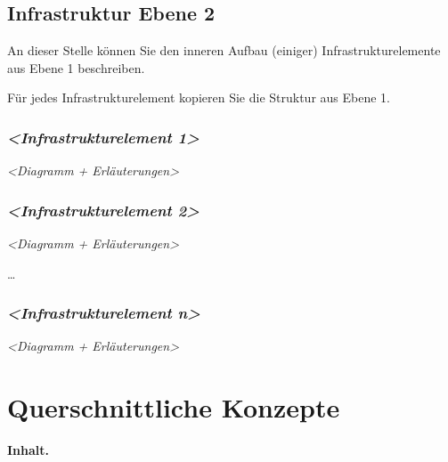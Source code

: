 \documentclass[]{article}
\begin{document}
\hypertarget{_infrastruktur_ebene_2}{%
\subsection{Infrastruktur Ebene 2}\label{_infrastruktur_ebene_2}}

An dieser Stelle können Sie den inneren Aufbau (einiger)
Infrastrukturelemente aus Ebene 1 beschreiben.

Für jedes Infrastrukturelement kopieren Sie die Struktur aus Ebene 1.

\hypertarget{__emphasis_infrastrukturelement_1_emphasis}{%
\subsubsection{\texorpdfstring{\emph{\textless{}Infrastrukturelement
1\textgreater{}}}{\textless{}Infrastrukturelement 1\textgreater{}}}\label{__emphasis_infrastrukturelement_1_emphasis}}

\emph{\textless{}Diagramm + Erläuterungen\textgreater{}}

\hypertarget{__emphasis_infrastrukturelement_2_emphasis}{%
\subsubsection{\texorpdfstring{\emph{\textless{}Infrastrukturelement
2\textgreater{}}}{\textless{}Infrastrukturelement 2\textgreater{}}}\label{__emphasis_infrastrukturelement_2_emphasis}}

\emph{\textless{}Diagramm + Erläuterungen\textgreater{}}

\ldots{}

\hypertarget{__emphasis_infrastrukturelement_n_emphasis}{%
\subsubsection{\texorpdfstring{\emph{\textless{}Infrastrukturelement
n\textgreater{}}}{\textless{}Infrastrukturelement n\textgreater{}}}\label{__emphasis_infrastrukturelement_n_emphasis}}

\emph{\textless{}Diagramm + Erläuterungen\textgreater{}}

\hypertarget{section-concepts}{%
\section{Querschnittliche Konzepte}\label{section-concepts}}

\textbf{Inhalt.}
\end{document}
